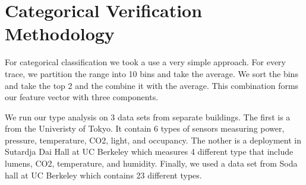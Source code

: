 \section{Categorical Verification Methodology}
For categorical classification we took a use a very simple approach.  For every trace, we partition the range into 10 bins
and take the average.  We sort the bins and take the top 2 and the combine it with the average.  This combination forms
our feature vector with three components.

We run our type analysis on 3 data sets from separate buildings.  The first is a from the Univeristy of Tokyo.  It contain 
6 types of sensors measuring power, pressure, temperature, CO2, light, and occupancy.
The nother is a deployment in Sutardja Dai Hall at UC Berkeley which measures 4 different type that include lumens, CO2, 
temperature, and humidity.
Finally, we used a data set from Soda hall at UC Berkeley which contains 23 different types.


